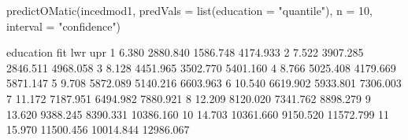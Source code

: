 \begin{Schunk}
\begin{Sinput}
 predictOMatic(incedmod1, predVals = list(education = "quantile"), n = 10, interval = "confidence")
\end{Sinput}
\begin{Soutput}
   education       fit       lwr       upr
1      6.380  2880.840  1586.748  4174.933
2      7.522  3907.285  2846.511  4968.058
3      8.128  4451.965  3502.770  5401.160
4      8.766  5025.408  4179.669  5871.147
5      9.708  5872.089  5140.216  6603.963
6     10.540  6619.902  5933.801  7306.003
7     11.172  7187.951  6494.982  7880.921
8     12.209  8120.020  7341.762  8898.279
9     13.620  9388.245  8390.331 10386.160
10    14.703 10361.660  9150.520 11572.799
11    15.970 11500.456 10014.844 12986.067
\end{Soutput}
\end{Schunk}
